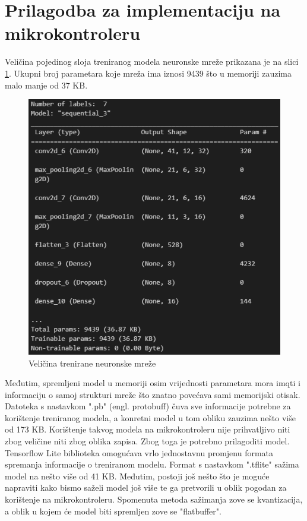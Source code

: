 \section{Prilagodba za implementaciju na mikrokontroleru}
\label{sec:convert}

Veličina pojedinog sloja treniranog modela neuronske mreže prikazana je na slici \ref{pic:size}.
Ukupni broj parametara koje mreža ima iznosi 9439 što u memoriji zauzima malo manje od 
37 KB.

\begin{figure}[htb]
    \centering
    \includegraphics[width=0.65\linewidth]{Chapters/neuronska_mreza/convert/struktura.png} 
    \caption{Veličina trenirane neuronske mreže}
    \label{pic:size}
\end{figure}

Međutim, spremljeni model u memoriji osim vrijednosti parametara mora imqti i informaciju 
o samoj strukturi mreže što znatno povećava sami memorijski otisak. Datoteka s nastavkom
".pb" (engl. protobuff) čuva sve informacije potrebne za korištenje treniranog modela,
a konretni model u tom obliku zauzima nešto više od 173 KB. Korištenje takvog modela
na mikrokontroleru nije prihvatljivo niti zbog veličine niti zbog oblika zapisa. Zbog 
toga je potrebno prilagoditi model. Tensorflow Lite biblioteka omogućava vrlo jednostavnu
promjenu formata spremanja informacije o treniranom modelu. Format s nastavkom ".tflite"
sažima model na nešto više od 41 KB. Međutim, postoji još nešto što je moguće napraviti
kako bismo saželi model još više te ga pretvorili u oblik pogodan za korištenje na
mikrokontroleru. Spomenuta metoda sažimanja zove se kvantizacija, a oblik u kojem će model
biti spremljen zove se "flatbuffer".

